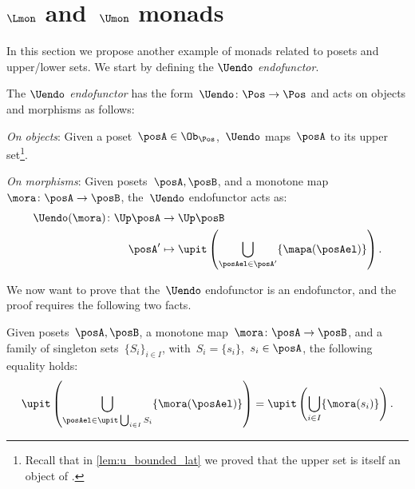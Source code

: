 \section{$\Lmon$ and~$\Umon$ monads}
In this section we propose another example of monads related to posets and upper/lower sets. We start by defining the \emph{$\Uendo$ endofunctor}.
\begin{definition}
  \label{def:Uendo}
  The \emph{$\Uendo$ endofunctor} has the form~$\Uendo \colon \Pos \to \Pos$ and acts on objects and morphisms as follows:
  \begin{compactenum}
    \item \emph{On objects}: Given a poset~$\posA \in \Ob_\Pos$,~$\Uendo$ maps~$\posA$ to its upper set\footnote{Recall that in \cref{lem:u_bounded_lat} we proved that the upper set is itself an object of \Pos.}.
    \item \emph{On morphisms}: Given posets~$\posA,\posB$, and a monotone map~$\mora \colon \posA\to \posB$, the~$\Uendo$ endofunctor acts as:
    \begin{equation}
      \begin{aligned}
        \Uendo(\mora)\colon \Up \posA&\to \Up \posB\\
        \posA'&\mapsto \upit \left( \bigcup_{\posAel\in \posA'} \{\mapa(\posAel)\}\right).
      \end{aligned}
    \end{equation}
  \end{compactenum}
\end{definition}
We now want to prove that the~$\Uendo$ endofunctor is an endofunctor, and the proof requires the following two facts.
\begin{lemma}
  \label{lem:unpack_u_functor}
  Given posets~$\posA,\posB$, a monotone map~$\mora \colon \posA \to \posB$, and a family of singleton sets~$\{S_i\}_{i\in I}$, with~$S_i=\{s_i\}$,~$s_i\in \posA$, the following equality holds:
  \begin{equation}
    \label{eq:lemma_unpack}
    \upit\left( \bigcup_{\posAel \in \upit \bigcup_{i\in I}S_i}\{\mora(\posAel)\}\right)= \upit \left( \bigcup_{i\in I} \{\mora(s_i)\}\right).
  \end{equation}
\end{lemma}
